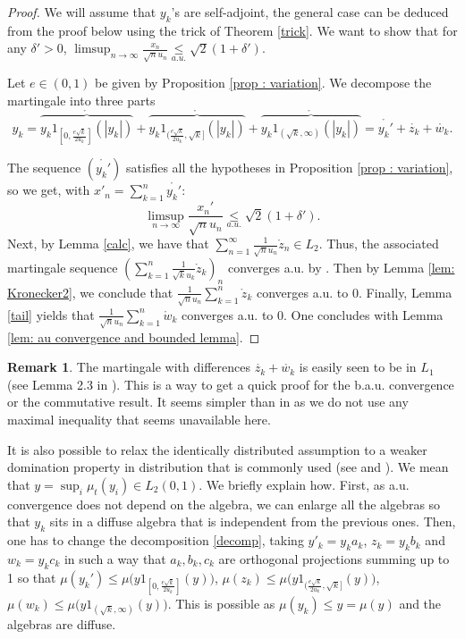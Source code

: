 \documentclass[10pt]{amsart}
\theoremstyle{definition}
\theoremstyle{myremark}
\newtheorem{rem}[thm]{Remark}
\numberwithin{equation}{section}
\begin{document}
  
\begin{proof}
We will assume that $y_k$’s are self-adjoint, the general case can be deduced from the proof below using the trick of Theorem \ref{trick}. We want to show that for any $\delta'>0$, 
 $\limsup_{n \to \infty} \frac{x_n}{\sqrt{n}u_n } \underset{a.u.}{\leq }\sqrt{2}(1+\delta')$. 

 Let $e\in (0,1)$ be given by Proposition \ref{prop : variation}. We decompose the martingale into three parts
\begin{equation}\label{decomp}y_k= \mathring{\overbrace{y_k 1_{[0, \frac {e \sqrt k}{2u_k}]}(|y_k|) }}+\mathring{\overbrace{y_k 1_{(\frac {e \sqrt k}{2u_k}, \sqrt k]}(|y_k|) }}+ \mathring{\overbrace{y_k 1_{(\sqrt k,\infty)}(|y_k|) }}= \mathring{y_k'} +\mathring{z_k} + \mathring{w_k}.\end{equation}

 The sequence $(\mathring{y_k'})$ satisfies all the hypotheses in Proposition
 \ref{prop : variation}, so we get, with $x'_n=\sum_{k=1}^n \mathring{y_k'}$: $$ 
 \limsup_{n \to \infty} \frac{x_n'}{\sqrt{n} u_n}  \underset{a.u.}{\leq }\sqrt{2}(1+\delta').$$ 
 Next, by  Lemma \ref{calc}, we have that $\sum_{n=1}^\infty \frac 1 {\sqrt n  {u_n}} \mathring z_n\in L_2$. Thus, the associated martingale sequence
 $(\sum_{k=1}^n \frac 1 {\sqrt k {u_k}} \mathring z_k)_n$ converges a.u. by \cite{cuculescu1971martingales}. Then by Lemma \ref{lem: Kronecker2}, we conclude that  $\frac 1 {\sqrt n  {u_n}}\sum_{k=1}^n
 \mathring z_k$ converges a.u. to 0. Finally, Lemma \ref{tail} yields that 
$\frac 1 {\sqrt n  {u_n}}\sum_{k=1}^n
\mathring w_k$ converges a.u. to 0. One concludes with Lemma
\ref{lem: au convergence and bounded lemma}.
\end{proof}
\begin{rem}
The martingale with differences $\mathring{z_k} + \mathring{w_k}$ is easily seen to be in $L_1$ (see Lemma 2.3 in \cite{deAcosta}). This is a way to get a quick proof for the b.a.u. convergence or the commutative result. It seems simpler than in \cite{deAcosta} as we do not use any maximal inequality that seems unavailable here.

It is also possible to relax the identically distributed assumption to a weaker domination property in distribution that is commonly used (see \cite{hartman1941law} and \cite{konwerska2008law}). We mean that $y=\sup_i \mu_t(y_i)\in L_2(0,1)$. We briefly explain how. First, as a.u. convergence does not depend on the algebra, we can enlarge all the algebras so that $y_k$ sits in a diffuse algebra that is independent from the previous ones. Then, one has to change the decomposition \eqref{decomp}, taking $y'_k=y_k a_k$, $z_k=y_k b_k$ and $w_k= y_k{c_k}$ in such a way that $a_k, b_k, c_k$ are orthogonal projections summing up to 1 so that $\mu(y_k')\leq \mu\big(y1_{[0,\frac {e \sqrt k}{2u_k}]}(y)\big)$, $\mu(z_k)\leq \mu\big(y 1_{(\frac {e \sqrt k}{2u_k}, \sqrt k]}(y)\big)$, $\mu(w_k)\leq \mu\big(y  1_{(\sqrt k,\infty)}(y)\big)$. This is possible as $\mu(y_k)\leq y=\mu(y)$ and the algebras are diffuse.
\end{rem}
\end{document}

